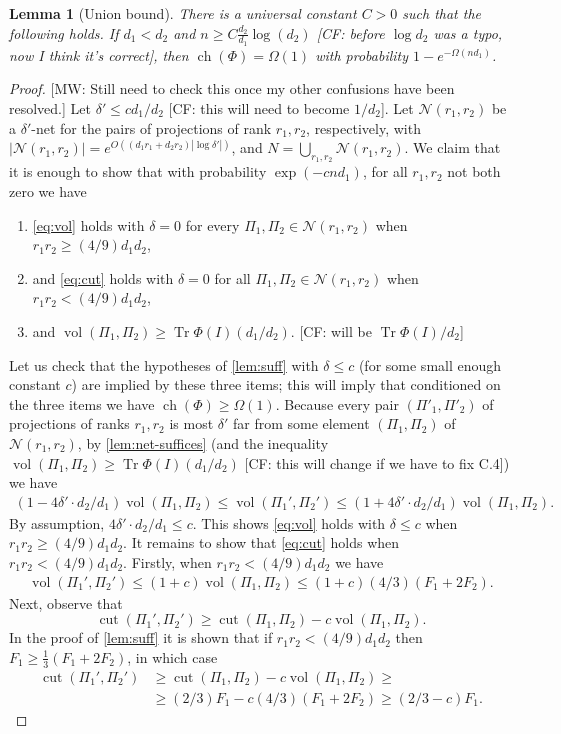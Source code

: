 \documentclass[aos]{imsart}
\newtheorem{lemma}[theorem]{Lemma}
\theoremstyle{definition}
\numberwithin{equation}{section}
\DeclareMathOperator{\vol}{vol}
\DeclareMathOperator{\cut}{cut}
\DeclareMathOperator{\ch}{ch}
\DeclareMathOperator{\tr}{Tr}
\newcommand{\cN}{\mathcal{N}}
\newcommand{\CF}[1]{{\color{purple}[CF: #1]}}
\newcommand{\MW}[1]{{\color{red}[MW: #1]}}
\newcommand{\CF}[1]{{}}
\newcommand{\MW}[1]{{}}
\begin{document}
\begin{appendix}
\begin{lemma}[Union bound]\label{lem:union}
There is a universal constant $C>0$ such that the following holds.
If $d_1 < d_2$ and $n \geq C \frac{d_2}{d_1} \log (d_2)$ \CF{before $\log d_2$ was a typo, now I think it's correct}, then $\ch(\Phi) = \Omega(1)$ with probability $1 - e^{- \Omega(n d_1)}$.
\end{lemma}
\begin{proof}
\MW{Still need to check this once my other confusions have been resolved.}
Let $\delta' \leq c d_1/d_2$ \CF{this will need to become $1/d_2$}. Let $\cN(r_1, r_2)$ be a $\delta'$-net for the pairs of projections of rank $r_1, r_2$, respectively, with $|\cN(r_1, r_2)| = e^{O((d_1r_1 + d_2 r_2) |\log \delta'|)}$, and $N = \bigcup_{r_1, r_2} \cN(r_1, r_2)$. We claim that it is enough to show that with probability $\exp( - c n d_1 )$, for all $r_1, r_2$ not both zero we have
\begin{enumerate}
\item \cref{eq:vol} holds with $\delta = 0$ for every $\Pi_1,\Pi_2 \in \cN(r_1, r_2)$ when $r_1 r_2 \geq (4/9) d_1 d_2$,
\item  and \cref{eq:cut} holds with $\delta =0$ for all $\Pi_1, \Pi_2 \in \cN(r_1, r_2)$ when $r_1 r_2 < (4/9) d_1 d_2$,
\item and $\vol(\Pi_1, \Pi_2) \geq \tr \Phi(I) (d_1/d_2)$. \CF{will be $\tr \Phi(I) /d_2$} 
\end{enumerate}
Let us check that the hypotheses of \cref{lem:suff} with $\delta \leq c$ (for some small enough constant $c$) are implied by these three items; this will imply that conditioned on the three items we have $\ch(\Phi) \geq \Omega(1)$. Because every pair $(\Pi'_1,\Pi'_2)$ of projections of ranks $r_1,r_2$ is most $\delta'$ far from some element $(\Pi_1, \Pi_2)$ of $\cN(r_1,r_2)$, by \cref{lem:net-suffices} (and the inequality $\vol(\Pi_1, \Pi_2) \geq \tr \Phi(I)(d_1/d_2)$ \CF{this will change if we have to fix C.4}) we have
\begin{align*} (1 - 4 \delta'  \cdot d_2/d_1) \vol(\Pi_1, \Pi_2) \leq  \vol(\Pi_1', \Pi_2') \leq  (1 + 4 \delta'  \cdot d_2/d_1) \vol(\Pi_1, \Pi_2).\end{align*}
By assumption, $4 \delta' \cdot d_2/d_1 \leq c$. This shows \cref{eq:vol} holds with $\delta \leq c$ when $r_1 r_2 \geq (4/9) d_1 d_2$. It remains to show that \cref{eq:cut} holds when $r_1 r_2 < (4/9) d_1 d_2$. Firstly, when $r_1 r_2 < (4/9) d_1 d_2$ we have
\begin{gather} \vol(\Pi_1', \Pi_2') \leq (1 + c) \vol(\Pi_1, \Pi_2) \leq  (1 + c)(4/3)(F_1 + 2 F_2).\label{eq:not-net-9a}\end{gather}
  Next, observe that
$$  \cut(\Pi_1', \Pi_2') \geq \cut(\Pi_1, \Pi_2) - c \vol(\Pi_1, \Pi_2).$$
In the proof of \cref{lem:suff} it is shown that if $r_1 r_2 < (4/9) d_1 d_2$ then $F_1 \geq \frac{1}{3} (F_1 + 2 F_2)$, in which case
\begin{align}
\cut(\Pi_1', \Pi_2') &\geq \cut(\Pi_1, \Pi_2) - c \vol(\Pi_1, \Pi_2) \geq \nonumber\\
& \geq (2/3) F_1 -  c (4/3)(F_1 + 2 F_2) \geq (2/3 - c) F_1.\label{eq:not-net-9b}
\end{align}


\end{proof}
\end{appendix}
\end{document}
